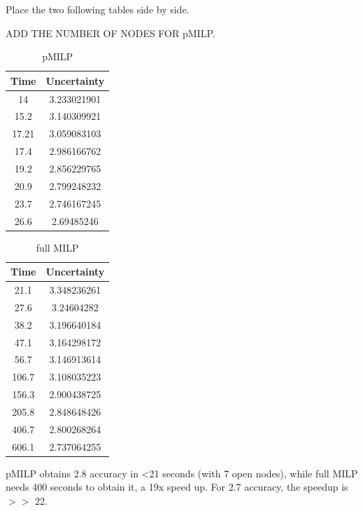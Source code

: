Place the two following tables side by side.


ADD THE NUMBER OF NODES FOR pMILP.




\begin{table}[h!]
	\centering
	\begin{tabular}{|c|c|}
	\hline
		Time & Uncertainty\\ 
	\hline	14 & 3.233021901\\
\hline	15.2 & 3.140309921\\
\hline	17.21 & 3.059083103\\
\hline	17.4 & 2.986166762\\
\hline	19.2 & 2.856229765\\
\hline	20.9 & 2.799248232\\
\hline	23.7 & 2.746167245\\
\hline	26.6 & 2.69485246\\	
	\hline
	
	
	\end{tabular}
	\caption{pMILP}
	\label{table12}
	\end{table}
	

	
	\begin{table}[h!]
		\centering
		\begin{tabular}{|c|c|}
			\hline
			Time & Uncertainty\\ 
			\hline	21.1 & 3.348236261\\
			\hline	27.6 & 3.24604282\\
			\hline	38.2 & 3.196640184\\
			\hline	47.1 & 3.164298172\\
			\hline	56.7 & 3.146913614\\
			\hline	106.7 & 3.108035223\\
			\hline	156.3 & 2.900438725\\
			\hline	205.8 & 2.848648426\\	
			\hline	406.7 & 2.800268264 \\	
			\hline	606.1 & 2.737064255\\	
			\hline
			
			
		\end{tabular}
		\caption{full MILP}
		\label{table13}
	\end{table}
	

pMILP obtains 2.8 accuracy in <21 seconds (with 7 open nodes), while full MILP needs 400 seconds to obtain it, a 19x speed up. For 2.7 accuracy, the speedup is $>>$ 22.

